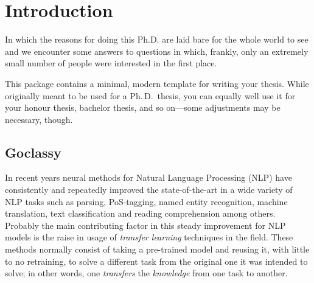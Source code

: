 \chapter{Introduction}

\begin{center}
  \begin{minipage}{0.5\textwidth}
    \begin{small}
      In which the reasons for doing this Ph.D. are laid bare for the whole world to see and we encounter some answers to questions in which, frankly, only an extremely small number of people were interested in the first place.
    \end{small}
  \end{minipage}
  \vspace{0.5cm}
\end{center}

\noindent This package contains a minimal, modern template for writing your
thesis. While originally meant to be used for a Ph.\,D.\ thesis, you can
equally well use it for your honour thesis, bachelor thesis, and so
on---some adjustments may be necessary, though.

\section{Goclassy}

In recent years neural methods for Natural Language Processing (NLP) have consistently and repeatedly improved the state-of-the-art in a wide variety of NLP tasks such as parsing, PoS-tagging, named entity recognition, machine translation, text classification and reading comprehension among others. Probably the main contributing factor in this steady improvement for NLP models is the raise in usage of \emph{transfer learning} techniques in the field. These methods normally consist of taking a pre-trained model and reusing it, with little to no retraining, to solve a different task from the original one it was intended to solve; in other words, one \emph{transfers} the \emph{knowledge} from one task to another.

